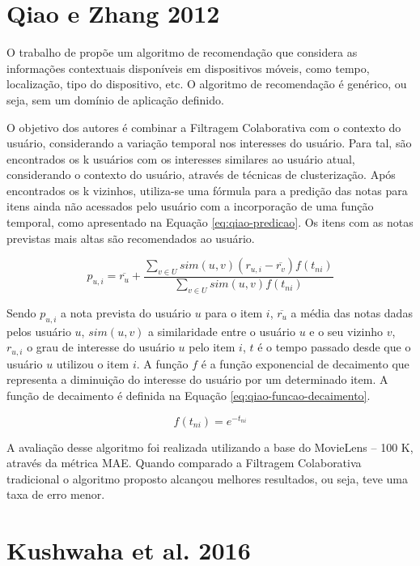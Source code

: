 \section{Qiao e Zhang 2012}

O trabalho de  propõe um algoritmo de recomendação que considera as informações
contextuais disponíveis em dispositivos móveis, como tempo, localização, tipo do dispositivo, etc. O algoritmo de
recomendação é genérico, ou seja, sem um domínio de aplicação definido.

O objetivo dos autores é combinar a Filtragem Colaborativa com o contexto do usuário, considerando a variação temporal
nos interesses do usuário. Para tal, são encontrados os k usuários com os interesses similares ao usuário atual,
considerando o contexto do usuário, através de técnicas de clusterização. Após encontrados os k vizinhos, utiliza-se
uma fórmula para a predição das notas para itens ainda não acessados pelo usuário com a incorporação de uma função
temporal, como apresentado na Equação \ref{eq:qiao-predicao}. Os itens com as notas previstas mais altas são
recomendados ao usuário.

\begin{equation}
  \label{eq:qiao-predicao}
  p_{u,i} = \overline{r_u} + \frac{\sum_{v \in U}{sim(u, v)(r_{u,i} - \overline{r_v})f(t_{ni})}}{\sum_{v \in U}{sim(u, v)f(t_{ni})}}
\end{equation}

Sendo $p_{u,i}$ a nota prevista do usuário $u$ para o item $i$, $\overline{r_u}$ a média das notas dadas pelos usuário
$u$, $sim(u, v)$ a similaridade entre o usuário $u$ e o seu vizinho $v$, $r_{u,i}$ o grau de interesse do usuário $u$
pelo item $i$, $t$ é o tempo passado desde que o usuário $u$ utilizou o item $i$. A função $f$ é a função
exponencial de decaimento que representa a diminuição do interesse do usuário por um determinado item. A função de
decaimento é definida na Equação \ref{eq:qiao-funcao-decaimento}.

\begin{equation}
  \label{eq:qiao-funcao-decaimento}
  f(t_{ni}) = e^{-t_{ni}}
\end{equation}

A avaliação desse algoritmo foi realizada utilizando a base do MovieLens – 100 K, através da métrica MAE. Quando
comparado a Filtragem Colaborativa tradicional o algoritmo proposto alcançou melhores resultados, ou seja, teve uma taxa de erro menor.

\section{Kushwaha et al. 2016}

